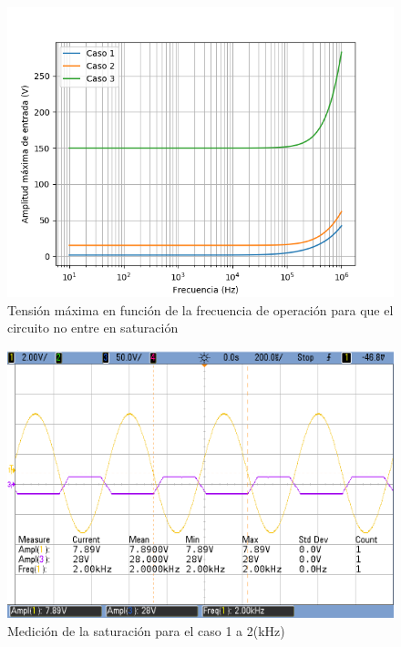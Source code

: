 \begin{figure}[H]
\begin{centering}
\includegraphics[scale=0.5]{../Ex1/iA/Resources1a/sat123}
\par\end{centering}
\caption{Tensión máxima en función de la frecuencia de operación para que el
circuito no entre en saturación}
\label{1_a_13_ggg}

\end{figure}

\begin{figure}[H]
\begin{centering}
\includegraphics[scale=0.3]{../Ex1/iA/Resources1a/sat1med}
\par\end{centering}
\caption{Medición de la saturación para el caso 1 a 2(kHz)}
\label{1_a_13_asd}

\end{figure}

